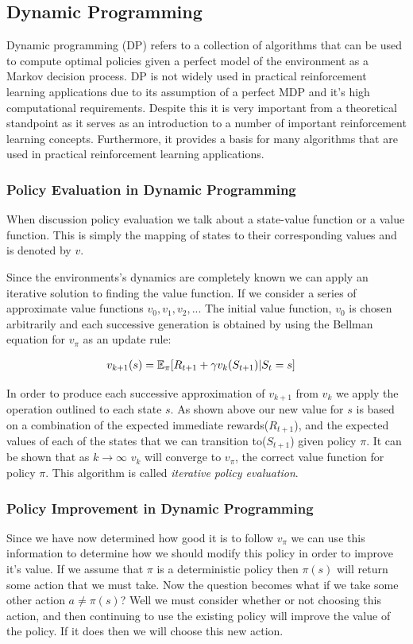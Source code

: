 \subsection{Dynamic Programming}\label{subsec:dp}
Dynamic programming (DP) refers to a collection of algorithms that can be used to compute optimal policies given a
perfect model of the environment as a Markov decision process\citep{sutton1998reinforcement}.
DP is not widely used in practical reinforcement learning applications due to its assumption
of a perfect MDP and it's high computational requirements.
Despite this it is very important from a theoretical standpoint as it serves as an introduction to a number
of important reinforcement learning concepts.
Furthermore, it provides a basis for many algorithms that are used in practical reinforcement learning applications.

\subsubsection{Policy Evaluation in Dynamic Programming}
When discussion policy evaluation we talk about a state-value function or a value function.
This is simply the mapping of states to their corresponding values and is denoted by $v$.

Since the environments's dynamics are completely known we can apply an iterative solution to finding
the value function.
If we consider a series of approximate value functions $v_0, v_1, v_2,..$.
The initial value function, $v_0$ is chosen arbitrarily and each successive generation is obtained by
using the Bellman equation for $v_\pi$ as an update rule\citep{sutton1998reinforcement}:

\begin{align}
    v_{k+1}(s) &= \operatorname{\mathbb{E}}_{\pi}\lbrack R_{t+1} + \gamma v_k(S_{t+1}) | S_t = s \rbrack
\end{align}

In order to produce each successive approximation of $v_{k+1}$ from $v_k$ we apply the operation outlined to each
state $s$.
As shown above our new value for $s$ is based on a combination of the expected immediate rewards($R_{t+1}$),
and the expected values of each of the states that we can transition to($S_{t+1}$) given policy $\pi$.
It can be shown that as $k\rightarrow\infty$ $v_k$ will converge to $v_\pi$, the correct value function for policy
$\pi$.
This algorithm is called \textit{iterative policy evaluation}\citep{sutton1998reinforcement}.

\subsubsection{Policy Improvement in Dynamic Programming}
Since we have now determined how good it is to follow $v_\pi$ we can use this information to determine how
we should modify this policy in order to improve it's value.
If we assume that $\pi$ is a deterministic policy then $\pi(s)$ will return some action that we must take.
Now the question becomes what if we take some other action $a \neq \pi(s)$?
Well we must consider whether or not choosing this action, and then continuing to use the existing policy will
improve the value of the policy.
If it does then we will choose this new action.

